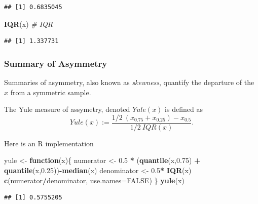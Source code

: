 \documentclass[]{book}
\newenvironment{Shaded}{\begin{snugshade}}{\end{snugshade}}
\newcommand{\CommentTok}[1]{\textcolor[rgb]{0.56,0.35,0.01}{\textit{#1}}}
\newcommand{\ControlFlowTok}[1]{\textcolor[rgb]{0.13,0.29,0.53}{\textbf{#1}}}
\newcommand{\DataTypeTok}[1]{\textcolor[rgb]{0.13,0.29,0.53}{#1}}
\newcommand{\FloatTok}[1]{\textcolor[rgb]{0.00,0.00,0.81}{#1}}
\newcommand{\KeywordTok}[1]{\textcolor[rgb]{0.13,0.29,0.53}{\textbf{#1}}}
\newcommand{\NormalTok}[1]{#1}
\newcommand{\OperatorTok}[1]{\textcolor[rgb]{0.81,0.36,0.00}{\textbf{#1}}}
\newcommand{\OtherTok}[1]{\textcolor[rgb]{0.56,0.35,0.01}{#1}}
\newcommand{\StringTok}[1]{\textcolor[rgb]{0.31,0.60,0.02}{#1}}
\theoremstyle{definition}
\theoremstyle{definition}
\theoremstyle{definition}
\theoremstyle{remark}
\let\BeginKnitrBlock\begin \let\EndKnitrBlock\end
\begin{document}
\begin{verbatim}
## [1] 0.6835045
\end{verbatim}

\begin{Shaded}
\begin{Highlighting}[]
\KeywordTok{IQR}\NormalTok{(x) }\CommentTok{# IQR}
\end{Highlighting}
\end{Shaded}

\begin{verbatim}
## [1] 1.337731
\end{verbatim}

\hypertarget{summary-of-asymmetry}{%
\subsubsection{Summary of Asymmetry}\label{summary-of-asymmetry}}

Summaries of asymmetry, also known as \emph{skewness}, quantify the departure of the \(x\) from a symmetric sample.

\BeginKnitrBlock{definition}[Yule]
\protect\hypertarget{def:unnamed-chunk-122}{}{\label{def:unnamed-chunk-122} {} }The Yule measure of assymetry, denoted \(Yule(x)\) is defined as
\[Yule(x) := \frac{1/2 \: (x_{0.75}+x_{0.25}) - x_{0.5} }{1/2 \: IQR(x)} .\]
\EndKnitrBlock{definition}

Here is an R implementation

\begin{Shaded}
\begin{Highlighting}[]
\NormalTok{yule <-}\StringTok{ }\ControlFlowTok{function}\NormalTok{(x)\{}
\NormalTok{  numerator <-}\StringTok{ }\FloatTok{0.5} \OperatorTok{*}\StringTok{ }\NormalTok{(}\KeywordTok{quantile}\NormalTok{(x,}\FloatTok{0.75}\NormalTok{) }\OperatorTok{+}\StringTok{ }\KeywordTok{quantile}\NormalTok{(x,}\FloatTok{0.25}\NormalTok{))}\OperatorTok{-}\KeywordTok{median}\NormalTok{(x) }
\NormalTok{  denominator <-}\StringTok{ }\FloatTok{0.5}\OperatorTok{*}\StringTok{ }\KeywordTok{IQR}\NormalTok{(x)}
  \KeywordTok{c}\NormalTok{(numerator}\OperatorTok{/}\NormalTok{denominator, }\DataTypeTok{use.names=}\OtherTok{FALSE}\NormalTok{)}
\NormalTok{\}}
\KeywordTok{yule}\NormalTok{(x)}
\end{Highlighting}
\end{Shaded}

\begin{verbatim}
## [1] 0.5755205
\end{verbatim}
\end{document}
